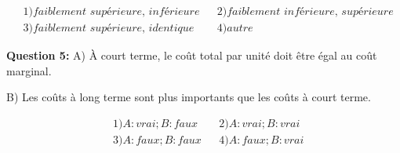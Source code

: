 \documentclass[11pt]{article}
\numberwithin{equation}{section}
\begin{document}
\begin{align*}
&1) \textit{faiblement supérieure, inférieure} && 2) \textit{faiblement inférieure, supérieure} \\
&3) \textit{faiblement supérieure, identique} && 4) \textit{autre}
\end{align*}

\textbf{Question 5:}
A) À court terme, le coût total par unité doit être égal au coût marginal.

B) Les coûts à long terme sont plus importants que les coûts à court terme.

\begin{align*}
&1) A: vrai; B: faux  && 2) A: vrai; B: vrai \\
&3) A: faux; B: faux && 4) A: faux; B: vrai
\end{align*}
\end{document}
